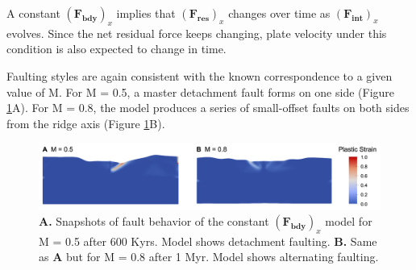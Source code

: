 \documentclass[letterpaper,12pt,notitle]{memphisthesis}                     %
\begin{document}
A constant $(\boldsymbol{F_{bdy}})_x$ implies that $(\boldsymbol{F_{res}})_x$ changes over time as $(\boldsymbol{F_{int}})_x$ evolves. Since the net residual force keeps changing, plate velocity under this condition is also expected to change in time.

Faulting styles are again consistent with the known correspondence to a given value of M. %
For M = 0.5, a master detachment fault forms on one side (Figure \ref{fig:fbfault}A). For M = 0.8, the model produces a series of small-offset faults on both sides from the ridge axis (Figure \ref{fig:fbfault}B).
%
\begin{figure}[!htb]
	\centering
	\includegraphics[width=0.99\linewidth,trim=8 8 8 8,clip]{./figs/fbfault.png}
	\caption{\textbf{A.} Snapshots of fault behavior of the constant $(\boldsymbol{F_{bdy}})_x$ model for M = 0.5 after 600 Kyrs. Model shows detachment faulting. \textbf{B.} Same as \textbf{A} but for M = 0.8 after 1 Myr. Model shows alternating faulting.}
	\label{fig:fbfault}
\end{figure}
\end{document}
